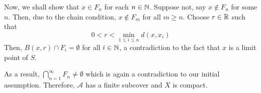 \begin{enumerate}
Now, we shall show that $x\in F_n$ for each $n\in\mathbb{N}$. Suppose not, say $x\notin F_n$ for some $n$. Then, due to the chain condition, $x\notin F_m$ for all $m\ge n$. Choose $r\in\mathbb{R}$ such that 
\begin{equation*}
    0 < r < \min_{1\le i\le n}d(x,x_i)
\end{equation*}
Then, $B(x, r)\cap F_i = \emptyset$ for all $i\in\mathbb{N}$, a contradiction to the fact that $x$ is a limit point of $S$.

As a result, $\bigcap_{n = 1}^\infty F_n\ne\emptyset$ which is again a contradiction to our initial assumption. Therefore, $\mathscr A$ has a finite subcover and $X$ is compact.
\end{enumerate}